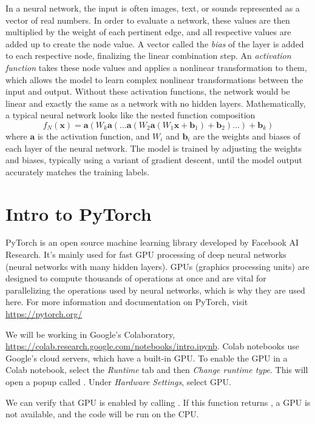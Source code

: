 In a neural network, the input is often images, text, or sounds represented as a vector of real numbers.
In order to evaluate a network, these values are then multiplied by the weight of each pertinent edge, and all respective values are added up to create the node value.
A vector called the \emph{bias} of the layer is added to each respective node, finalizing the linear combination step.
An \emph{activation function} takes these node values and applies a nonlinear transformation to them, which allows the model to learn complex nonlinear transformations between the input and output.
Without these activation functions, the network would be linear and exactly the same as a network with no hidden layers.
Mathematically, a typical neural network looks like the nested function composition
\[
f_N(\mathbf{x}) = \mathbf{a}(W_k\mathbf{a}(\ldots\mathbf{a}(W_2\mathbf{a}(W_1\mathbf{x}+\mathbf{b}_1)+\mathbf{b}_2)\ldots)+\mathbf{b}_k)
\]
where \(\mathbf{a}\) is the activation function, and \(W_i\) and \(\mathbf{b}_i\) are the weights and biases of each layer of the neural network.
The model is trained by adjusting the weights and biases, typically using a variant of gradient descent, until the model output accurately matches the training labels.

\section*{Intro to PyTorch}

PyTorch is an open source machine learning library developed by Facebook AI Research.
It's mainly used for fast GPU processing of deep neural networks (neural networks with many hidden layers).
GPUs (graphics processing units) are designed to compute thousands of operations at once and are vital for parallelizing the operations used by neural networks, which is why they are used here.
For more information and documentation on PyTorch, visit \url{https://pytorch.org/}

We will be working in Google's Colaboratory, \url{https://colab.research.google.com/notebooks/intro.ipynb}.
Colab notebooks use Google's cloud servers, which have a built-in GPU.
To enable the GPU in a Colab notebook, select the \textit{Runtime} tab and then \textit{Change runtime type}.
This will open a popup called .
Under \textit{Hardware Settings}, select GPU.

We can verify that GPU is enabled by calling .
If this function returns , a GPU is not available, and the code will be run on the CPU.

